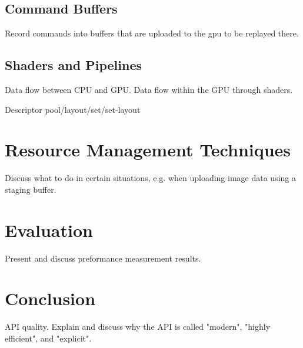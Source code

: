 \documentclass[draft,12pt]{report}
\begin{document}
    \section{Command Buffers}
      Record commands into buffers that are uploaded to the gpu to be replayed there.

    \section{Shaders and Pipelines}
      Data flow between CPU and GPU. Data flow within the GPU through shaders.

      Descriptor pool/layout/set/set-layout


  \chapter{Resource Management Techniques}
    Discuss what to do in certain situations, e.g. when uploading image data using a staging buffer.


  \chapter{Evaluation}
    Present and discuss preformance measurement results.


  \chapter{Conclusion}
    API quality. Explain and discuss why the API is called "modern", "highly efficient", and "explicit".
\end{document}
